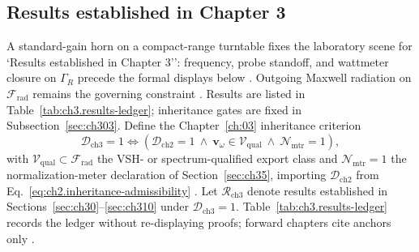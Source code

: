 \subsection{Results established in Chapter 3}
\label{sec:ch3111}
A standard-gain horn on a compact-range turntable fixes the laboratory scene for `Results established in Chapter 3'': frequency, probe standoff, and wattmeter closure on $\Gamma_R$ precede the formal displays below \cite{hansen1988}. Outgoing Maxwell radiation on $\mathcal{F}_{\mathrm{rad}}$ remains the governing constraint \cite{stratton1941}.
Results are listed in Table~\ref{tab:ch3.results-ledger}; inheritance gates are fixed in Subsection~\ref{sec:ch303}.
Define the Chapter~\ref{ch:03} inheritance criterion
\begin{equation}
\label{eq:ch3.inheritance-admissibility}
\mathcal{D}_{\mathrm{ch3}}=1
\iff
\left(
\mathcal{D}_{\mathrm{ch2}}=1\
\wedge\
\mathbf{v}_\omega\in\mathcal{V}_{\mathrm{qual}}\
\wedge\
\mathcal{N}_{\mathrm{mtr}}=1
\right),
\end{equation}
with \(\mathcal{V}_{\mathrm{qual}}\subset\mathcal{F}_{\mathrm{rad}}\) the VSH- or spectrum-qualified export class and \(\mathcal{N}_{\mathrm{mtr}}=1\) the normalization-meter declaration of Section~\ref{sec:ch35},
importing \(\mathcal{D}_{\mathrm{ch2}}\) from Eq.~\eqref{eq:ch2.inheritance-admissibility} \cite{stratton1941}.
Let \(\mathcal{R}_{\mathrm{ch3}}\) denote results established in Sections~\ref{sec:ch30}--\ref{sec:ch310} under
\(\mathcal{D}_{\mathrm{ch3}}=1\). Table~\ref{tab:ch3.results-ledger} records the ledger without re-displaying proofs;
forward chapters cite anchors only \cite{hansen1988}.
